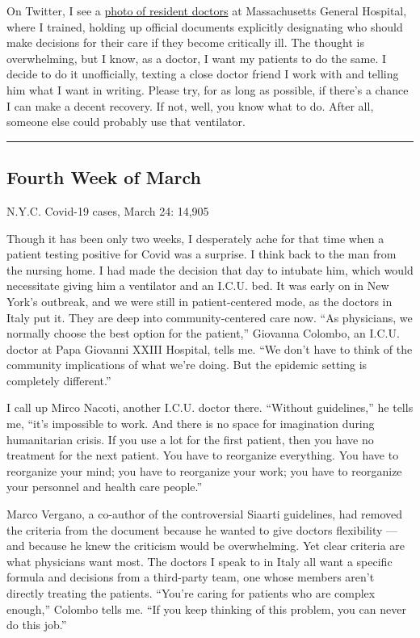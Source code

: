 On Twitter, I see a
\href{https://twitter.com/sdslavin/status/1241327739954749440}{photo of
resident doctors} at Massachusetts General Hospital, where I trained,
holding up official documents explicitly designating who should make
decisions for their care if they become critically ill. The thought is
overwhelming, but I know, as a doctor, I want my patients to do the
same. I decide to do it unofficially, texting a close doctor friend I
work with and telling him what I want in writing. Please try, for as
long as possible, if there's a chance I can make a decent recovery. If
not, well, you know what to do. After all, someone else could probably
use that ventilator.

\begin{center}\rule{0.5\linewidth}{\linethickness}\end{center}

\hypertarget{fourth-week-of-march-1}{%
\subsection{Fourth Week of March}\label{fourth-week-of-march-1}}

N.Y.C. Covid-19 cases, March 24: 14,905

Though it has been only two weeks, I desperately ache for that time when
a patient testing positive for Covid was a surprise. I think back to the
man from the nursing home. I had made the decision that day to intubate
him, which would necessitate giving him a ventilator and an I.C.U. bed.
It was early on in New York's outbreak, and we were still in
patient-centered mode, as the doctors in Italy put it. They are deep
into community-centered care now. ``As physicians, we normally choose
the best option for the patient,'' Giovanna Colombo, an I.C.U. doctor at
Papa Giovanni XXIII Hospital, tells me. ``We don't have to think of the
community implications of what we're doing. But the epidemic setting is
completely different.''

I call up Mirco Nacoti, another I.C.U. doctor there. ``Without
guidelines,'' he tells me, ``it's impossible to work. And there is no
space for imagination during humanitarian crisis. If you use a lot for
the first patient, then you have no treatment for the next patient. You
have to reorganize everything. You have to reorganize your mind; you
have to reorganize your work; you have to reorganize your personnel and
health care people.''

Marco Vergano, a co-author of the controversial Siaarti guidelines, had
removed the criteria from the document because he wanted to give doctors
flexibility --- and because he knew the criticism would be overwhelming.
Yet clear criteria are what physicians want most. The doctors I speak to
in Italy all want a specific formula and decisions from a third-party
team, one whose members aren't directly treating the patients. ``You're
caring for patients who are complex enough,'' Colombo tells me. ``If you
keep thinking of this problem, you can never do this job.''

